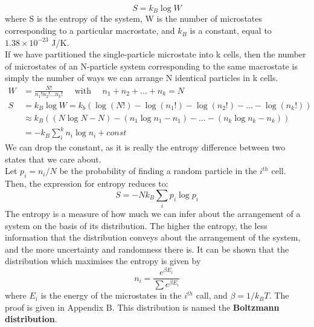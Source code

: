 \documentclass[letterpaper,10pt,english]{article}
\begin{document}
\begin{equation}
S=k_B \log W
\end{equation}
where S is the entropy of the system, W is the number of microstates corresponding to a particular macrostate, and $k_B$ is a constant, equal to $1.38 \times 10^{-23}$ J/K. \\
If we have partitioned the single-particle microstate into k cells, then the number of microstates of an N-particle system corresponding to the same macrostate is simply the number of ways we can arrange N identical particles in k cells. \\
\begin{align*}
W&=\frac{N!}{n_1!n_2!\ldots n_k!} \quad \text{ with } \quad n_1+n_2+\ldots+n_k=N \\
S&=k_B \log W=k_b \left(\log(N!)-\log(n_1!)-\log(n_2!)-\ldots-\log(n_k!)\right)\\
& \approx k_B \left( (N \log N -N)-(n_1 \log n_1-n_1)-\ldots-(n_k \log n_k-n_k) \right) \\
&=-k_B\sum_i^k{n_i \log n_i}+const
\end{align*}
We can drop the constant, as it is really the entropy difference between two states that we care about. \\
Let $p_i=n_i/N$ be the probability of finding a random particle in the $i^{th}$ cell. Then, the expression for entropy reduces to:
\begin{equation}
S=-Nk_B\sum_i{p_i \log p_i}
\end{equation}
The entropy is a measure of how much we can infer about the arrangement of a system on the basis of its distribution. The higher the entropy, the less information that the distribution conveys about the arrangement of the system, and the more uncertainty and randomness there is. It can be shown that the distribution which maximises the entropy is given by 
\begin{equation}
n_i=\frac{e^{\beta E_i}}{\sum{e^{\beta E_i}}}
\end{equation}
where $E_i$ is the energy of the microstates in the $i^{th}$ call, and $\beta=1/k_B T$. The proof is given in Appendix B. This distribution is named the \textbf{Boltzmann distribution}. 
\end{document}
